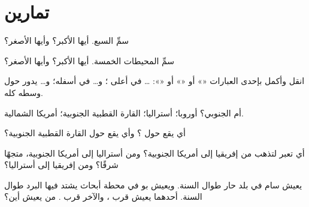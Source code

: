 \section{تمارين}

\begin{exercise}[$\star$]\label{exo:g3:continents-and-oceans:1}
سمِّ  السبع. أيها الأكبر؟ وأيها الأصغر؟
\end{exercise}

\begin{exercise}[$\star$]\label{exo:g3:continents-and-oceans:2}
سمِّ المحيطات الخمسة. أيها الأكبر؟ وأيها الأصغر؟
\end{exercise}

\begin{exercise}[$\star$]\label{exo:g3:continents-and-oceans:3}
انقل وأكمل بإحدى العبارات «» أو «» أو «»: \dots{}
في أعلى ؛ و\dots{} في أسفله؛ و\dots{}
يدور حول وسطه كله.
\end{exercise}

\begin{exercise}[$\star$]\label{exo:g3:continents-and-oceans:4}
 أم الجنوبي؟ أوروبا؛ أستراليا؛ القارة القطبية الجنوبية؛
أمريكا الشمالية.
\end{exercise}

\begin{exercise}[$\star$]\label{exo:g3:continents-and-oceans:5}
أي  يقع حول ؟ وأي  يقع حول
القارة القطبية الجنوبية؟
\end{exercise}

\begin{exercise}[$\star\star$]\label{exo:g3:continents-and-oceans:6}
أي  تعبر لتذهب من إفريقيا إلى أمريكا الجنوبية؟ ومن
أستراليا إلى أمريكا الجنوبية، متجهًا شرقًا؟ ومن إفريقيا إلى أستراليا؟
\end{exercise}

\begin{exercise}[$\star\star$]\label{exo:g3:continents-and-oceans:7}
يعيش سام في بلد حار طوال السنة. ويعيش بو في محطة أبحاث يشتد فيها البرد
طوال السنة. أحدهما يعيش قرب ، والآخر قرب . من يعيش
أين؟
\end{exercise}

